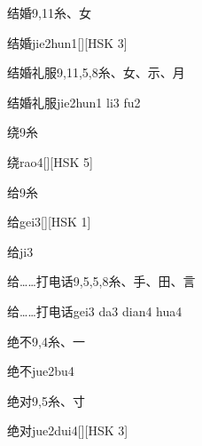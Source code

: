\begin{entry}{结婚}{9,11}{⽷、⼥}
  \begin{phonetics}{结婚}{jie2hun1}[][HSK 3]
  \end{phonetics}
\end{entry}

\begin{entry}{结婚礼服}{9,11,5,8}{⽷、⼥、⽰、⽉}
  \begin{phonetics}{结婚礼服}{jie2hun1 li3 fu2}
  \end{phonetics}
\end{entry}

\begin{entry}{绕}{9}{⽷}
  \begin{phonetics}{绕}{rao4}[][HSK 5]
  \end{phonetics}
\end{entry}

\begin{entry}{给}{9}{⽷}
  \begin{phonetics}{给}{gei3}[][HSK 1]
  \end{phonetics}
  \begin{phonetics}{给}{ji3}
  \end{phonetics}
\end{entry}

\begin{entry}{给……打电话}{9,5,5,8}{⽷、⼿、⽥、⾔}
  \begin{phonetics}{给……打电话}{gei3 da3 dian4 hua4}
  \end{phonetics}
\end{entry}

\begin{entry}{绝不}{9,4}{⽷、⼀}
  \begin{phonetics}{绝不}{jue2bu4}
  \end{phonetics}
\end{entry}

\begin{entry}{绝对}{9,5}{⽷、⼨}
  \begin{phonetics}{绝对}{jue2dui4}[][HSK 3]
  \end{phonetics}
\end{entry}

